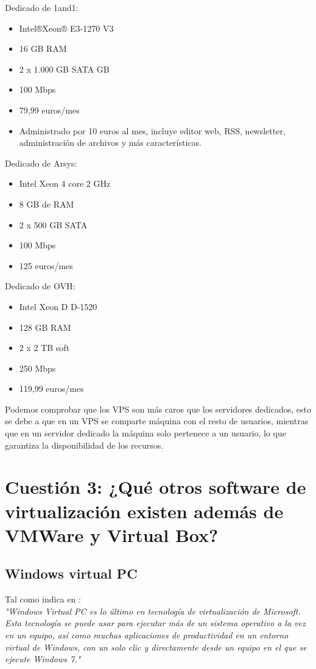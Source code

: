 Dedicado de 1and1: \cite{6}
\begin{itemize}
\item Intel®Xeon® E3-1270 V3
\item 16 GB RAM
\item 2 x 1.000 GB SATA GB
\item 100 Mbps
\item 79,99 euros/mes
\item Administrado por 10 euros al mes, incluye editor web, RSS, newsletter, administración de archivos y más características.
\end{itemize}

Dedicado de Arsys: \cite{7}
\begin{itemize}
\item Intel Xeon 4 core 2 GHz
\item 8 GB de RAM
\item 2 x 500 GB SATA
\item 100 Mbps
\item 125 euros/mes
\end{itemize}

Dedicado de OVH: \cite{8}
\begin{itemize}
\item Intel Xeon D D-1520
\item 128 GB RAM
\item 2 x 2 TB soft
\item 250 Mbps
\item 119,99 euros/mes
\end{itemize}

Podemos comprobar que los VPS son más caros que los servidores dedicados, esto se debe a que en un VPS se comparte máquina con el resto de usuarios, mientras que en un servidor dedicado la máquina solo pertenece a un usuario, lo que garantiza la disponibilidad de los recursos.


\section{Cuestión 3: ¿Qué otros software de virtualización existen además de VMWare y Virtual Box?}

\subsection{Windows virtual PC}
Tal como indica en \cite{9}: \\
\textit{"Windows Virtual PC es lo último en tecnología de virtualización de Microsoft. Esta tecnología se puede usar para ejecutar más de un sistema operativo a la vez en un equipo, así como muchas aplicaciones de productividad en un entorno virtual de Windows, con un solo clic y directamente desde un equipo en el que se ejecute Windows 7."} 

